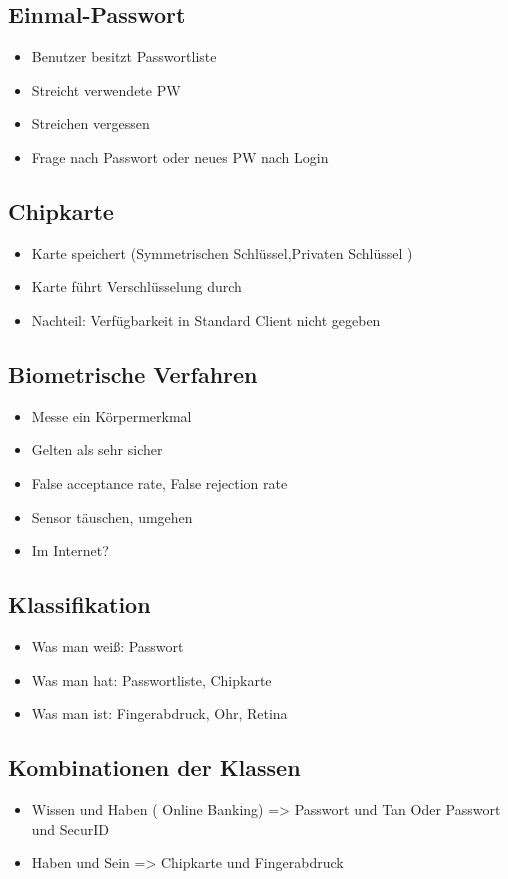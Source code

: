 \subsection*{ Einmal-Passwort}
\begin{itemize}
	\item Benutzer besitzt Passwortliste
	\item Streicht verwendete PW
	\item Streichen vergessen
	\item  Frage nach Passwort oder neues PW nach Login
\end{itemize}

\subsection*{ Chipkarte}
\begin{itemize}
	\item Karte speichert (Symmetrischen Schlüssel,Privaten Schlüssel )
	\item Karte führt Verschlüsselung durch
	\item Nachteil: Verfügbarkeit in Standard Client nicht gegeben
\end{itemize}

\subsection*{ Biometrische Verfahren}
\begin{itemize}
	\item Messe ein Körpermerkmal
	\item Gelten als sehr sicher
	\item False acceptance rate, False rejection rate
	\item Sensor täuschen, umgehen
	\item Im Internet?
\end{itemize}

\subsection*{ Klassifikation}
\begin{itemize}
	\item Was man weiß: Passwort
	\item Was man hat: Passwortliste, Chipkarte
	\item Was man ist: Fingerabdruck, Ohr, Retina
\end{itemize}

\subsection*{ Kombinationen der Klassen}
\begin{itemize}
	\item Wissen und Haben ( Online Banking) => Passwort und Tan Oder Passwort und SecurID
	\item Haben und Sein => Chipkarte und Fingerabdruck
\end{itemize}

